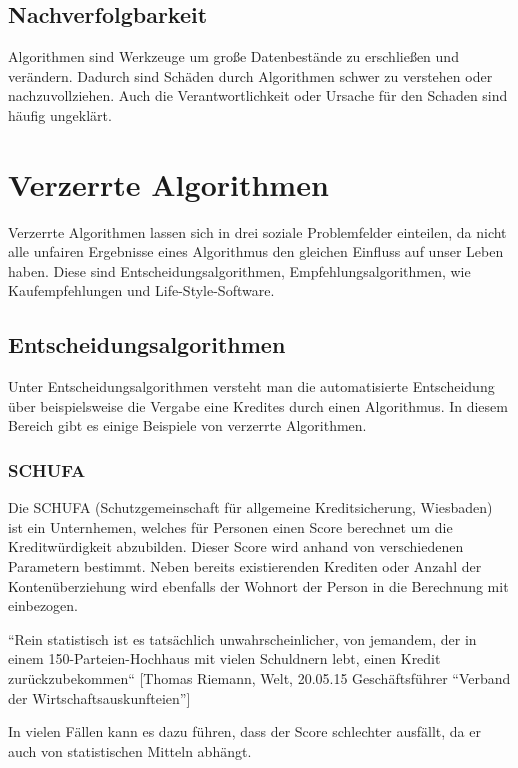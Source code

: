 \subsection{Nachverfolgbarkeit}
Algorithmen sind Werkzeuge um große Datenbestände zu erschließen und verändern. Dadurch sind Schäden durch Algorithmen schwer zu verstehen oder nachzuvollziehen. Auch die Verantwortlichkeit oder Ursache für den Schaden sind häufig ungeklärt.

\section{Verzerrte Algorithmen}

Verzerrte Algorithmen lassen sich in drei soziale Problemfelder einteilen, da nicht alle unfairen Ergebnisse eines Algorithmus den gleichen Einfluss auf unser Leben haben. 
Diese sind Entscheidungsalgorithmen, Empfehlungsalgorithmen, wie Kaufempfehlungen und Life-Style-Software.


\subsection{Entscheidungsalgorithmen}
Unter Entscheidungsalgorithmen versteht man die automatisierte Entscheidung über beispielsweise die Vergabe eine Kredites durch einen Algorithmus. In diesem Bereich gibt es einige Beispiele von verzerrte Algorithmen. 

\subsubsection{SCHUFA}
Die SCHUFA (Schutzgemeinschaft für allgemeine Kreditsicherung, Wiesbaden) ist ein Unternhemen, welches für Personen einen Score berechnet um die Kreditwürdigkeit abzubilden. Dieser Score wird anhand von verschiedenen Parametern bestimmt. Neben bereits existierenden Krediten oder Anzahl der Kontenüberziehung wird ebenfalls der Wohnort der Person in die Berechnung mit einbezogen. \newline

“Rein statistisch ist es tatsächlich unwahrscheinlicher, von jemandem, der in einem 150-Parteien-Hochhaus mit vielen Schuldnern lebt, einen Kredit zurückzubekommen“
[Thomas Riemann, Welt, 20.05.15 Geschäftsführer “Verband der Wirtschaftsauskunfteien”]

In vielen Fällen kann es dazu führen, dass der Score schlechter ausfällt, da er auch von statistischen Mitteln abhängt. \cite{welt2015}


